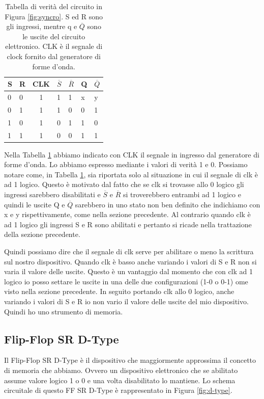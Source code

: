 \begin{table}[h]
    \centering
    \begin{tabular}{llcll|ll}
	\toprule
		S & R & CLK & $\overline{S}$ & $\overline{R}$ & Q & $\overline{Q}$ \\
	\midrule
		0 & 0 & 1 & 1 & 1 & x & y \\
		0 & 1 & 1 & 1 & 0 & 0 & 1 \\
		1 & 0 & 1 & 0 & 1 & 1 & 0 \\
		1 & 1 & 1 & 0 & 0 & 1 & 1 \\
	\bottomrule
	\end{tabular}
    \caption{Tabella di verità del circuito in Figura \ref{fig:syncro}. S ed R sono gli ingressi, mentre q e $\overline{Q}$ sono le uscite del circuito elettronico. CLK è il segnale di clock fornito dal generatore di forme d'onda.}
    \label{tab:syncro}
\end{table}

Nella Tabella \ref{tab:syncro} abbiamo indicato con CLK il segnale in ingresso dal generatore di forme d'onda. Lo abbiamo espresso mediante i valori di verità 1 e 0. Possiamo notare come, in Tabella \ref{tab:syncro}, sia riportata solo al situazione in cui il segnale di clk è ad 1 logico. Questo è motivato dal fatto che se clk si trovasse allo 0 logico gli ingressi sarebbero disabilitati e $\overline{S}$ e $\overline{R}$ si troverebbero entrambi ad 1 logico e quindi le uscite Q e $\overline{Q}$ sarebbero in uno stato non ben definito che indichiamo con x e y rispettivamente, come nella sezione precedente. Al contrario quando clk è ad 1 logico gli ingressi S e R sono abilitati e pertanto si ricade nella trattazione della sezione precedente.

Quindi possiamo dire che il segnale di clk serve per abilitare o meno la scrittura sul nostro dispositivo. Quando clk è basso anche variando i valori di S e R non si varia il valore delle uscite. Questo è un vantaggio dal momento che con clk ad 1 logico io posso settare le uscite in una delle due configurazioni (1-0 o 0-1) ome visto nella sezione precedente. In seguito portando clk allo 0 logico, anche variando i valori di S e R io non vario il valore delle uscite del mio dispositivo. Quindi ho uno strumento di memoria.  

\subsection*{Flip-Flop SR D-Type}

Il Flip-Flop SR D-Type è il dispositivo che maggiormente approssima il concetto di memoria che abbiamo. Ovvero un dispositivo elettronico che se abilitato assume valore logico 1 o 0 e una volta disabilitato lo mantiene. Lo schema circuitale di questo FF SR D-Type è rappresentato in Figura \ref{fig:d-type}.

